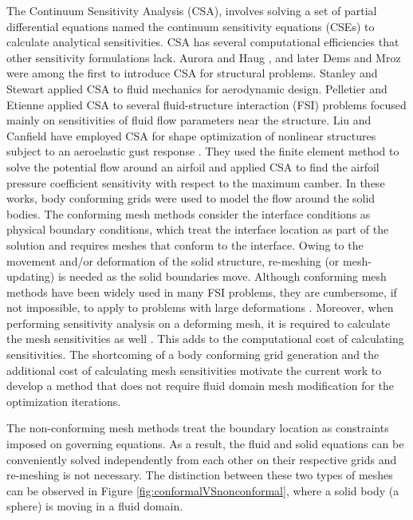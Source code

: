 \documentclass[12pt]{aiaa-pretty}
\begin{document}
The Continuum Sensitivity Analysis (CSA), involves solving a set of partial differential equations named the continuum sensitivity equations (CSEs) to calculate analytical sensitivities. CSA has several computational efficiencies that other sensitivity formulations lack. Aurora and Haug \cite{Arora}, and later Dems and Mroz \cite{Dems-Mroz} were among the first to introduce CSA for structural problems. Stanley and Stewart \cite{stanley2002design} applied CSA to fluid mechanics for aerodynamic design. Pelletier and Etienne applied CSA to several fluid-structure interaction (FSI) problems \cite{etienne2005general} focused mainly on sensitivities of fluid flow parameters near the structure. Liu and Canfield have employed CSA for shape optimization of nonlinear structures subject to an aeroelastic gust response \cite{liu2013equivalence}. They used the finite element method to solve the potential flow around an airfoil and applied CSA to find the airfoil pressure coefficient sensitivity with respect to the maximum camber. In these works, body conforming grids were used to model the flow around the solid bodies. The conforming mesh methods consider the interface conditions as physical boundary conditions, which treat the interface location as part of the solution and requires meshes that conform to the interface. Owing to the movement and/or deformation of the solid structure, re-meshing (or mesh-updating) is needed as the solid boundaries move. Although conforming mesh methods have been widely used in many FSI problems, they are cumbersome, if not impossible, to apply to problems with large deformations \cite{sahin2009arbitrary}. Moreover, when performing sensitivity analysis on a deforming mesh, it is required to calculate the mesh sensitivities as well \cite{liu2013boundary}. This adds to the computational cost of calculating  sensitivities. The shortcoming of a body conforming grid generation and the additional cost of calculating mesh sensitivities motivate the current work to develop a method that does not require fluid domain mesh modification for the optimization iterations.

The non-conforming mesh methods treat the boundary location as constraints imposed on governing equations. As a result, the fluid and solid equations can be conveniently solved independently from each other on their respective grids and re-meshing is not necessary. The distinction between these two types of meshes can be observed in Figure \ref{fig:conformalVSnonconformal}, where a solid body (a sphere) is moving in a fluid domain.
\end{document}
